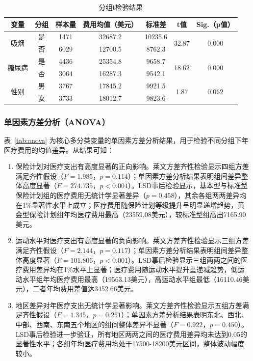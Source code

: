 \documentclass[a4paper]{ctexart}
\begin{document}
\begin{table}[H]
\centering
\caption{分组t检验结果}
\label{tab:ttest}
\begin{tabular}{ccccccc}
\toprule
变量 & 分组 & 样本量 & 费用均值（美元） & 标准差 & t值 & Sig.（p值） \\
\midrule
\multirow{2}{*}{吸烟} & 是 & 1471 & 32687.2 & 10235.6 & \multirow{2}{*}{32.87} & \multirow{2}{*}{0.000} \\
& 否 & 6029 & 12700.5 & 8762.3 & & \\
\multirow{2}{*}{糖尿病} & 是 & 4436 & 25354.8 & 9658.7 & \multirow{2}{*}{18.62} & \multirow{2}{*}{0.000} \\
& 否 & 3064 & 16287.3 & 9542.1 & & \\
\multirow{2}{*}{性别} & 男 & 3767 & 17845.2 & 9921.5 & \multirow{2}{*}{1.87} & \multirow{2}{*}{0.062} \\
& 女 & 3733 & 18012.7 & 9823.6 & & \\
\bottomrule
\end{tabular}
\end{table}

\subsubsection{单因素方差分析（ANOVA）}

表~\ref{tab:anova} 为核心多分类变量的单因素方差分析结果，用于检验不同分组下年医疗费用的均值差异。从结果可知：
\begin{enumerate}[(1)]
\item 保险计划对医疗支出有高度显著的正向影响。莱文方差齐性检验显示四组方差满足齐性假设（\(F=1.985\)，\(p=0.114\)）；单因素方差分析结果表明组间差异整体高度显著（\(F=274.735\)，\(p<0.001\)）。LSD事后检验显示，基本型与标准型保险计划组的医疗费用无统计学显著差异（\(p=0.458\)），其余各组两两差异均在1\%显著性水平上成立；医疗费用随保险计划等级提升呈明显递增趋势，黄金型保险计划组年均医疗费用最高（23559.08美元），较标准型组高出7165.90美元。

\item 运动水平对医疗支出有高度显著的负向影响。莱文方差齐性检验显示三组方差满足齐性假设（\(F=2.144\)，\(p=0.117\)）；单因素方差分析结果表明组间差异整体高度显著（\(F=101.806\)，\(p<0.001\)）。LSD事后检验显示三组两两之间的医疗费用差异均在1\%水平上显著；医疗费用随运动水平提升呈递减趋势，低运动水平组年均医疗费用最高（19563.13美元），高运动水平组最低（16110.46美元），二者年均费用差值达3452.66美元。

\item 地区差异对年医疗支出无统计学显著影响。莱文方差齐性检验显示五组方差满足齐性假设（\(F=1.345\)，\(p=0.251\)）；单因素方差分析结果表明东北、西北、中部、西南、东南五个地区的组间整体差异不显著（\(F=0.922\)，\(p=0.450\)）。LSD事后检验进一步验证，所有地区两两之间的医疗费用差异均未达到0.05的显著性水平；各组年均医疗费用均处于17500-18200美元区间，整体波动幅度较小。
\end{enumerate}
\end{document}
